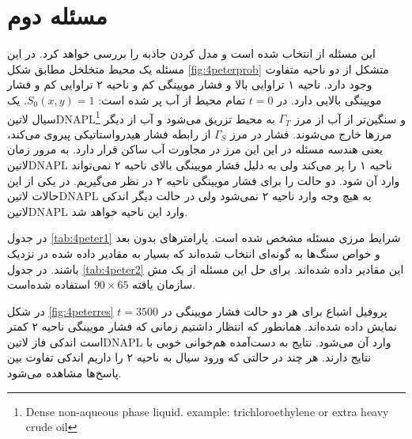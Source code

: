 \section{مسئله دوم}
این مسئله از \cite{basthabil,bastn} انتخاب شده است و مدل کردن جاذبه را بررسی خواهد کرد. در این مسئله یک محیط متخلخل مطابق شکل \ref{fig:4peterprob} متشکل از دو ناحیه متفاوت وجود دارد. ناحیه ۱ تراوایی بالا و فشار مویینگی کم و ناحیه ۲ تراوایی کم و فشار مویینگی بالایی دارد. در $t=0$ تمام محیط از آب پر شده است: $S_0(x,y) = 1$. یک سیال \text‌لاتین{DNAPL}\footnote{Dense non-aqueous phase liquid. example: trichloroethylene or extra heavy crude oil} و سنگین‌تر از آب از مرز $\Gamma_T$ به محیط تزریق می‌شود و آب از دیگر مرز‌ها خارج می‌شوند. فشار در مرز $\Gamma_S$ از رابطه فشار هیدرواستاتیکی پیروی می‌کند، یعنی هندسه مسئله در این این مرز در مجاورت آب ساکن قرار دارد. به مرور زمان  \text‌لاتین{DNAPL} ناحیه ۱ را پر می‌کند ولی به دلیل فشار مویینگی بالای ناحیه ۲ نمی‌تواند وارد آن شود. دو حالت را برای فشار مویینگی ناحیه ۲ در نظر می‌گیریم. در یکی از این حالات \text‌لاتین{DNAPL} به هیچ وجه وارد ناحیه ۲ نمی‌شود ولی در حالت دیگر اندکی \text‌لاتین{DNAPL} وارد این ناحیه خواهد شد.

 در جدول \ref{tab:4peter1} شرایط مرزی مسئله مشخص شده است. پارامتر‌های بدون بعد و خواص سنگ‌ها به گونه‌ای انتخاب شده‌اند که بسیار به مقادیر داده شده در \cite{basthabil,bastn} نزدیک باشند. در جدول \ref{tab:4peter2} این مقادیر داده‌ شده‌اند. برای حل این مسئله از یک مش سازمان یافته $90\times 65$ استفاده شده‌است. 
 
 در شکل \ref{fig:4peterres} پروفیل اشباع برای هر دو حالت فشار مویینگی در $t=3500$ نمایش داده شده‌اند. همانطور که انتظار داشتیم زمانی که فشار مویینگی ناحیه ۲ کمتر است اندکی فاز \text‌لاتین{DNAPL} وارد آن می‌شود. نتایج به دست‌آمده هم‌خوانی خوبی با نتایج  \cite{basthabil,bastn}  دارند. هر چند در حالتی که ورود سیال به ناحیه ۲ را داریم اندکی تفاوت بین پاسخ‌ها مشاهده می‌شود.
 
